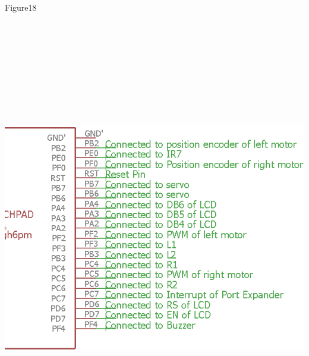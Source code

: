 \documentclass[a4paper,12pt,oneside]{book}
\begin{document}
\begin{itemize}
			\hspace{6 cm}
			Figure18\\
			\includegraphics[width=15cm, height=20cm]{Images/PlugandPlay}
			

\end{itemize}
\end{document}
